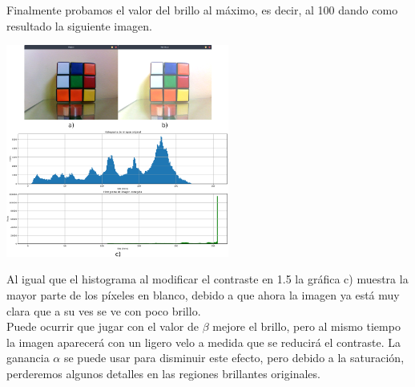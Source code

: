 Finalmente probamos el valor del brillo al máximo, es decir, al 100 dando como resultado la siguiente imagen.
\begin{center}
	\includegraphics[width=0.55\textwidth]{Contenido/Cuerpo/Capitulo4/Fig22.eps}
	\label{Fig9}
\end{center}
Al igual que el histograma al modificar el contraste en 1.5 la gráfica c) muestra la mayor parte de los píxeles en blanco, debido
a que ahora la imagen ya está muy clara que a su ves se ve con poco brillo.\\
Puede ocurrir que jugar con el valor de $\beta$ mejore el brillo, pero al mismo tiempo la imagen aparecerá con un ligero
velo a medida que se reducirá el contraste. La ganancia $\alpha$ se puede usar para disminuir este efecto, pero debido a la
saturación, perderemos algunos detalles en las regiones brillantes originales.
